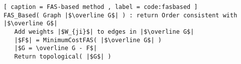 \begin{lstlisting}[ caption = FAS-based method , label = code:fasbased ]
FAS_Based( Graph |$\overline G$| ) : return Order consistent with |$\overline G$|
   Add weights |$W_{ji}$| to edges in |$\overline G$|
   |$F$| = MinimumCostFAS( |$\overline G$| )
   |$G = \overline G - F$|
   Return topological( |$G$| )
\end{lstlisting}